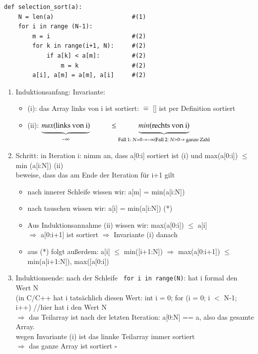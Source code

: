 \documentclass[11pt, fleqn]{scrreprt}
\begin{document}
\begin{itemize}
        \begin{verbatim}
def selection_sort(a):
    N = len(a)                      #(1)
    for i in range (N-1):
        m = i                       #(2)
        for k in range(i+1, N):     #(2)
            if a[k] < a[m]:         #(2)
                m = k               #(2)
        a[i], a[m] = a[m], a[i]     #(2)
        \end{verbatim}
        \begin{enumerate}
        \item Induktionsanfang: Invariante:
        \begin{itemize}[label={}]
        \item (i): das Array links von i ist sortiert: $\widehat{=}$ [] ist per Definition sortiert
        \item (ii): $\underbrace{max(\text{links von i})}_{- \infty}\hspace*{1cm} \leq \underbrace{min(\text{rechts von i})}_{\text{Fall 1: } N = 0 \rightarrow - \infty |
            \text{Fall 2: } N > 0 \rightarrow \text{ ganze Zahl}}$
        \end{itemize}
        \item Schritt: in Iteration i: nimm an, dass a[0:i] sortiert ist (i) und max(a[0:i]) $\leq$ min (a[i:N]) (ii)\\
        beweise, dass das am Ende der Iteration für i+1 gilt
        \begin{itemize}
        \item nach innerer Schleife wissen wir: a[m] = min(a[i:N])
        \item nach tauschen wissen wir: a[i] = min(a[i:N]) (*)
        \item Aus Induktionsannahme (ii) wissen wir: max(a[0:i]) $\leq$ a[i] \\
        $\Rightarrow$ a[0:i+1] ist sortiert $\Rightarrow$ Invariante (i) danach
        \item aus (*) folgt außerdem: a[i] $\leq$ min([i+1:N]) $\Rightarrow$ max(a[0:i+1]) $\leq$ min(a[i+1:N]), max([a[0:i])
        \end{itemize}
        \item Induktionsende: nach der Schleife \verb| for i in range(N)|: hat i formal den Wert N\\
        (in C/C++ hat i tatsächlich diesen Wert: int i = 0; for (i = 0; i $<$ N-1; i++) {} //hier hat i den Wert N \\
        $\Rightarrow$ das Teilarray ist nach der letzten Iteration: a[0:N] == a, also das gesamte Array.\\
        wegen Invariante (i) ist das linnke Teilarray immer sortiert \\
        $\Rightarrow$ das ganze Array ist sortiert \hspace*{9cm} $\square$
        \end{enumerate}
    \end{itemize}
\end{document}
